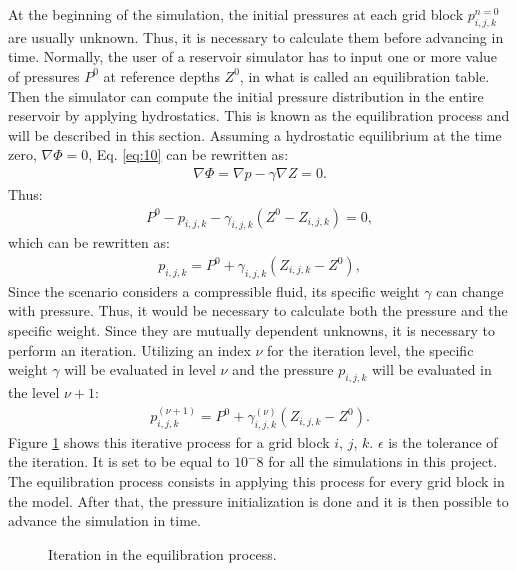 At the beginning of the simulation, the initial pressures at each grid block $p_{i,j,k}^{n=0}$ are usually unknown. Thus, it is necessary to calculate them before advancing in time. Normally, the user of a reservoir simulator has to input one or more value of pressures $P^0$ at reference depths $Z^0$, in what is called an equilibration table. Then the simulator can compute the initial pressure distribution in the entire reservoir by applying hydrostatics. This is known as the equilibration process and will be described in this section. Assuming a hydrostatic equilibrium at the time zero, $\nabla \Phi = 0$, Eq. \ref{eq:10} can be rewritten as:
\begin{align}
\label{00}
\nabla \Phi=\nabla p - \gamma \nabla Z = 0.
\end{align}
Thus:
\begin{align}
\label{00aaa}
P^0 - p_{i,j,k} - \gamma_{i,j,k}(Z^0 - Z_{i,j,k}) = 0,
\end{align}
which can be rewritten as:
\begin{align}
\label{00aa}
p_{i,j,k}=P^0+\gamma_{i,j,k}(Z_{i,j,k}-Z^0),
\end{align}
Since the scenario considers a compressible fluid, its specific weight $\gamma$ can change with pressure. Thus, it would be necessary to calculate both the pressure and the specific weight.  Since they are mutually dependent unknowns, it is necessary to perform an iteration. Utilizing an index $\nu$ for the iteration level, the specific weight $\gamma$ will be evaluated in level $\nu$ and the pressure $p_{i,j,k}$ will be evaluated in the level $\nu+1$:
\begin{align}
\label{00a}
p^{(\nu+1)}_{i,j,k}=P^0+\gamma^{(\nu)}_{i,j,k}(Z_{i,j,k}-Z^0).
\end{align}
Figure \ref{cha:solution-fig:equilibration_process_iteration} shows this iterative process for a grid block $i$, $j$, $k$. $\epsilon$ is the tolerance of the iteration. It is set to be equal to $10^-8$ for all the simulations in this project. The equilibration process consists in applying this process for every grid block in the model. After that, the pressure initialization is done and it is then possible to advance the simulation in time.

\begin{figure}[H]
	\centering
	
	\caption{Iteration in the equilibration process.}
	\label{cha:solution-fig:equilibration_process_iteration}
\end{figure}


